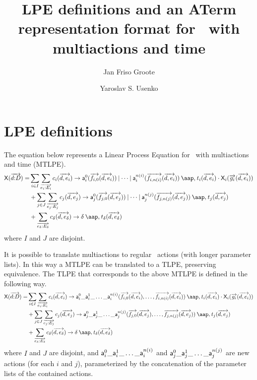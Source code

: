 \documentclass[fleqn,a4paper,dvips]{article}
\title{LPE definitions and an ATerm representation format for \mcrl\ 
  with multiactions and time}
\author{Jan Friso Groote \and Yaroslav S. Usenko}
\begin{document}
\maketitle
\tableofcontents

\section{LPE definitions}

The equation below represents a Linear Process Equation for \mcrl\ 
with multiactions and time (MTLPE).
\begin{gather}
\begin{split}
\pr{X}(\vect{d\ap D})=&\sum_{i\in I}\sum_{\vect{e_i\ap E_i}} c_i(\vect{d,e_i})\to\act{a}^0_i(\vect{f_{i,0}}(\vect{d,e_i}))\comm\dots\comm\act{a}^{n(i)}_i(\vect{f_{i,n(i)}}(\vect{d,e_i}))\at t_i(\vect{d,e_i})\seqc
\pr{X}_i(\vect{g_i}(\vect{d,e_i}))\notag\\
&+\sum_{j\in J}\sum_{\vect{e_j\ap E_j}} c_j(\vect{d,e_j})\to\act{a}^0_j(\vect{f_{j,0}}(\vect{d,e_j}))\comm\dots\comm\act{a}^{n(j)}_j(\vect{f_{j,n(j)}}(\vect{d,e_j}))\at t_j(\vect{d,e_j})\\
&+\sum_{\vect{e_\delta\ap E_\delta}} c_\delta(\vect{d,e_\delta})\to\delta\at t_\delta(\vect{d,e_\delta})
\end{split}
\end{gather}
where $I$ and $J$ are disjoint.

It is possible to translate multiactions to regular \mcrl\ actions
(with longer parameter lists).  In this way a MTLPE can be translated
to a TLPE, preserving equivalence.  The TLPE that corresponds to the
above MTLPE is defined in the following way.
\begin{gather}
\begin{split}
\pr{X}(\vect{d\ap D})=&\sum_{i\in I}\sum_{\vect{e_i\ap E_i}} c_i(\vect{d,e_i})\to\act{a}^0_i\_\act{a}^1_i\_\dots\_\act{a}^{n(i)}_i(\vect{f_{i,0}}(\vect{d,e_i}),\dots,\vect{f_{i,n(i)}}(\vect{d,e_i}))\at t_i(\vect{d,e_i})\seqc
\pr{X}_i(\vect{g_i}(\vect{d,e_i}))\notag\\
&+\sum_{j\in J}\sum_{\vect{e_j\ap E_j}} c_j(\vect{d,e_j})\to\act{a}^0_j\_\act{a}^1_j\_\dots\_\act{a}^{n(j)}_j(\vect{f_{j,0}}(\vect{d,e_j}),\dots,\vect{f_{j,n(j)}}(\vect{d,e_j}))\at t_j(\vect{d,e_j})\\
&+\sum_{\vect{e_\delta\ap E_\delta}} c_\delta(\vect{d,e_\delta})\to\delta\at t_\delta(\vect{d,e_\delta})
\end{split}
\end{gather}
where $I$ and $J$ are disjoint, and
$\mathsf{a}^0_i\_\mathsf{a}^1_i\_\dots\_\mathsf{a}^{n(i)}_i$ and
$\mathsf{a}^0_j\_\mathsf{a}^1_j\_\dots\_\mathsf{a}^{n(j)}_j$ are new actions
(for each $i$ and $j$), parameterized by the concatenation of the
parameter lists of the contained actions.
\end{document}
